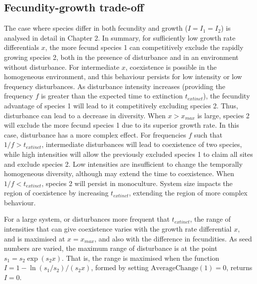 \documentclass[preprint,10pt,reqno]{report}
\begin{document}
\subsection{Fecundity-growth trade-off}
The case where species differ in both fecundity and growth ($I=I_1=I_2$) is analysed in detail in Chapter 2. In summary, for sufficiently low growth rate differentials $x$,  the more fecund species 1 can competitively exclude the rapidly growing species 2, both in the presence of disturbance and in an environment without disturbance. For intermediate $x$, coexistence is possible in the homogeneous environment, and this behaviour persists for low intensity or low frequency disturbances. As disturbance intensity increases (providing the frequency $f$ is greater than the expected time to extinction $t_{extinct}$), the fecundity advantage of species 1 will lead to it competitively excluding species 2. Thus, disturbance can lead to a decrease in diversity. When $x>x_{max}$ is large, species 2 will exclude the more fecund species 1 due to its superior growth rate. In this case, disturbance has a more complex effect. For frequencies $f$ such that $1/f > t_{extinct}$, intermediate disturbances will lead to coexistence of two species, while high intensities will allow the previously excluded species 1 to claim all sites and exclude species 2. Low intensities are insufficient to change the temporally homogeneous diversity, although may extend the time to coexistence. When $1/f < t_{extinct}$, species 2 will persist in monoculture. System size impacts the region of coexistence by increasing $t_{extinct}$, extending the region of more complex behaviour.

For a large system, or disturbances more frequent that $t_{extinct}$, the range of intensities that can give coexistence varies with the growth rate differential $x$, and is maximised at $x=x_{max}$, and also with the difference in fecundities. As seed numbers are varied, the maximum range of disturbance is at the point $s_1=s_2\exp(s_2x)$. That is, the range is maximised when the function $I=1-\ln(s_1/s_2)/(s_2x)$, formed by setting $\text{AverageChange}(1)=0$, returns $I=0$.
\end{document}
